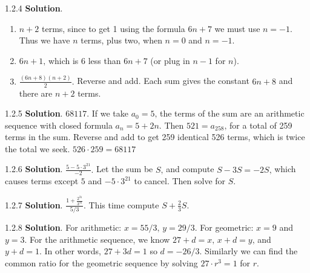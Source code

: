 \documentclass[11pt,]{book}
\theoremstyle{ptxplainnotitle}
\theoremstyle{ptxplaintitle}
\theoremstyle{ptxdefinitionnotitle}
\theoremstyle{ptxdefinitiontitle}
\theoremstyle{ptxdefinitionnotitle}
\theoremstyle{ptxdefinitiontitle}
\theoremstyle{ptxdefinitionnotitle}
\theoremstyle{ptxdefinitiontitle}
\theoremstyle{ptxdefinitiontitlenonumber}
\theoremstyle{ptxdefinitiontitlenonumber}
\numberwithin{equation}{chapter}
\begin{document}
\begin{divisionexercise}{1.2.4}
\textbf{Solution}.\quad%
\hypertarget{p-274}{}%
\leavevmode%
\begin{enumerate}[label=\alph*.]
\item\hypertarget{li-161}{}\hypertarget{p-275}{}%
\(n+2\) terms, since to get 1 using the formula \(6n+7\) we must use \(n=-1\text{.}\)  Thus we have \(n\) terms, plus two, when \(n=0\) and \(n=-1\text{.}\)%
\item\hypertarget{li-162}{}\hypertarget{p-276}{}%
\(6n+1\text{,}\) which is 6 less than \(6n+7\) (or plug in \(n-1\) for \(n\)).%
\item\hypertarget{li-163}{}\hypertarget{p-277}{}%
\(\frac{(6n+8)(n+2)}{2}\text{.}\)  Reverse and add.  Each sum gives the constant \(6n+8\) and there are \(n+2\) terms.%
\end{enumerate}
%
\end{divisionexercise}%
\begin{divisionexercise}{1.2.5}
\textbf{Solution}.\quad%
\hypertarget{p-283}{}%
\(68117\text{.}\)  If we take \(a_0 = 5\text{,}\) the terms of the sum are an arithmetic sequence with closed formula \(a_n = 5+2n\text{.}\)  Then \(521 = a_{258}\text{,}\) for a total of 259 terms in the sum.  Reverse and add to get 259 identical 526 terms, which is twice the total we seek.  \(526\cdot 259 = 68117\)%
\end{divisionexercise}%
\begin{divisionexercise}{1.2.6}
\textbf{Solution}.\quad%
\hypertarget{p-289}{}%
\(\frac{5-5\cdot 3^{21}}{-2}\text{.}\)  Let the sum be \(S\text{,}\) and compute \(S - 3S = -2S\text{,}\) which causes terms except \(5\) and \(-5\cdot 3^{21}\) to cancel.  Then solve for \(S\text{.}\)%
\end{divisionexercise}%
\begin{divisionexercise}{1.2.7}
\textbf{Solution}.\quad%
\hypertarget{p-295}{}%
\(\frac{1 + \frac{2^{31}}{3^{31}}}{5/3}\text{.}\)  This time compute \(S + \frac{2}{3}S\text{.}\)%
\end{divisionexercise}%
\begin{divisionexercise}{1.2.8}
\textbf{Solution}.\quad%
\hypertarget{p-303}{}%
For arithmetic: \(x = 55/3\text{,}\) \(y = 29/3\text{.}\) For geometric: \(x = 9\) and \(y = 3\text{.}\)  For the arithmetic sequence, we know \(27 + d = x\text{,}\) \(x + d = y\text{,}\) and \(y + d = 1\text{.}\)  In other words, \(27 + 3d = 1\) so \(d = -26/3\text{.}\)  Similarly we can find the common ratio for the geometric sequence by solving \(27\cdot r^3 = 1\) for \(r\text{.}\)%
\end{divisionexercise}%
\end{document}
